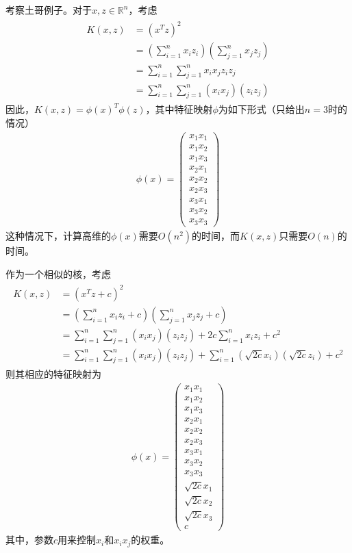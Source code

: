 考察土哥例子。对于$x,z\in \mathbb{R}^n$，考虑
\begin{eqnarray}
\begin{aligned}
K(x,z)&=(x^Tz)^2\\
&= \left(\sum_{i=1}^nx_iz_i\right)\left(\sum_{j=1}^nx_jz_j\right)\\
&= \sum_{i=1}^n\sum_{j=1}^nx_ix_jz_iz_j\\
&= \sum_{i=1}^n\sum_{j=1}^n(x_ix_j)(z_iz_j)
\end{aligned}
\end{eqnarray}
因此，$K(x,z)=\phi(x)^T\phi(z)$，其中特征映射$\phi$为如下形式（只给出$n=3$时的情况）
\begin{eqnarray}
\phi(x)=
\begin{pmatrix}
x_1x_1\\
x_1x_2\\
x_1x_3\\
x_2x_1\\
x_2x_2\\
x_2x_3\\
x_3x_1\\
x_3x_2\\
x_3x_3
\end{pmatrix}
\end{eqnarray}
这种情况下，计算高维的$\phi(x)$需要$O(n^2)$的时间，而$K(x,z)$只需要$O(n)$的时间。

作为一个相似的核，考虑
\begin{eqnarray}
\begin{aligned}
K(x,z)&=(x^Tz+c)^2\\
&=\left(\sum_{i=1}^nx_iz_i+c\right)\left(\sum_{j=1}^nx_jz_j+c\right)\\
&=\sum_{i=1}^n\sum_{j=1}^n(x_ix_j)(z_iz_j)+2c\sum_{i=1}^nx_iz_i+c^2\\
&=\sum_{i=1}^n\sum_{j=1}^n(x_ix_j)(z_iz_j)+\sum_{i=1}^n(\sqrt{2c}x_i)(\sqrt{2c}z_i)+c^2
\end{aligned}
\end{eqnarray}
则其相应的特征映射为
\begin{eqnarray}
\phi(x)=
\begin{pmatrix}
x_1x_1\\
x_1x_2\\
x_1x_3\\
x_2x_1\\
x_2x_2\\
x_2x_3\\
x_3x_1\\
x_3x_2\\
x_3x_3\\
\sqrt{2c}x_1\\
\sqrt{2c}x_2\\
\sqrt{2c}x_3\\
c
\end{pmatrix}
\end{eqnarray}
其中，参数$c$用来控制$x_i$和$x_ix_j$的权重。

